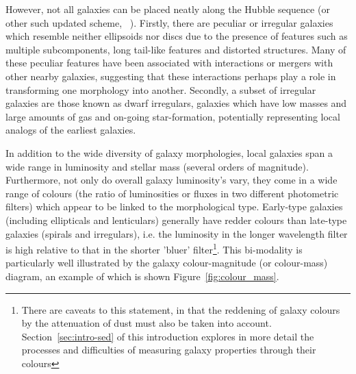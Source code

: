 However, not all galaxies can be placed neatly along the Hubble sequence (or other such updated scheme, \citeauthor{deVaucouleurs:1959vq}~\citeyear{deVaucouleurs:1959vq}). Firstly, there are peculiar or irregular galaxies which resemble neither ellipsoids nor discs due to the presence of features such as multiple subcomponents, long tail-like features and distorted structures. Many of these peculiar features have been associated with interactions or mergers with other nearby galaxies, suggesting that these interactions perhaps play a role in transforming one morphology into another. Secondly, a subset of irregular galaxies are those known as dwarf irregulars, galaxies which have low masses and large amounts of gas and on-going star-formation, potentially representing local analogs of the earliest galaxies. 

In addition to the wide diversity of galaxy morphologies, local galaxies span a wide range in luminosity and stellar mass (several orders of magnitude). Furthermore, not only do overall galaxy luminosity's vary, they come in a wide range of colours (the ratio of luminosities or fluxes in two different photometric filters) which appear to be linked to the morphological type. Early-type galaxies (including ellipticals and lenticulars) generally have redder colours than late-type galaxies (spirals and irregulars), i.e. the luminosity in the longer wavelength filter is high relative to that in the shorter 'bluer' filter\footnote{There are caveats to this statement, in that the reddening of galaxy colours by the attenuation of dust must also be taken into account. Section~\ref{sec:intro-sed} of this introduction explores in more detail the processes and difficulties of measuring galaxy properties through their colours}. This bi-modality is particularly well illustrated by the galaxy colour-magnitude (or colour-mass) diagram, an example of which is shown Figure~\ref{fig:colour_mass}.

